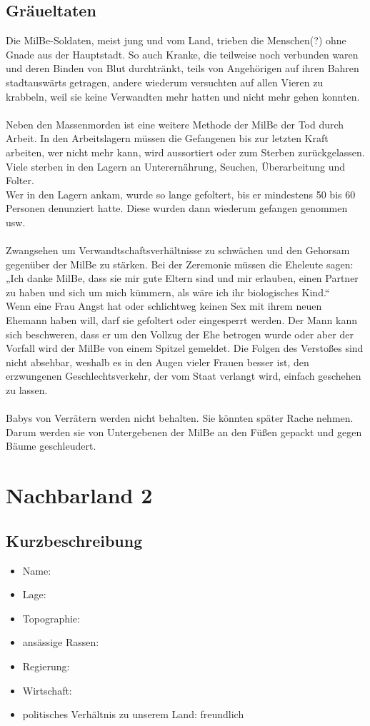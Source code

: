 \subsection{Gräueltaten}
Die MilBe-Soldaten, meist jung und vom Land, trieben die Menschen(?) ohne Gnade aus der Hauptstadt. So auch Kranke, die teilweise noch verbunden waren und deren Binden von Blut durchtränkt, teils von Angehörigen auf ihren Bahren stadtauswärts getragen, andere wiederum versuchten auf allen Vieren zu krabbeln, weil sie keine Verwandten mehr hatten und nicht mehr gehen konnten.\\
\\
Neben den Massenmorden ist eine weitere Methode der MilBe der Tod durch Arbeit. In den Arbeitslagern müssen die Gefangenen bis zur letzten Kraft arbeiten, wer nicht mehr kann, wird aussortiert oder zum Sterben zurückgelassen. Viele sterben in den Lagern an Unterernährung, Seuchen, Überarbeitung und Folter.\\
Wer in den Lagern ankam, wurde so lange gefoltert, bis er mindestens 50 bis 60 Personen denunziert hatte. Diese wurden dann wiederum gefangen genommen usw.\\\\
Zwangsehen um Verwandtschaftsverhältnisse zu schwächen und den Gehorsam gegenüber der MilBe zu stärken. Bei der Zeremonie müssen die Eheleute sagen: „Ich danke MilBe, dass sie mir gute Eltern sind und mir erlauben, einen Partner zu haben und sich um mich kümmern, als wäre ich ihr biologisches Kind.“\\
Wenn eine Frau Angst hat oder schlichtweg keinen Sex mit ihrem neuen Ehemann haben will, darf sie gefoltert oder eingesperrt werden. Der Mann kann sich beschweren, dass er um den Vollzug der Ehe betrogen wurde oder aber der Vorfall wird der MilBe von einem Spitzel gemeldet. Die Folgen des Verstoßes sind nicht absehbar, weshalb es in den Augen vieler Frauen besser ist, den erzwungenen Geschlechtsverkehr, der vom Staat verlangt wird, einfach geschehen zu lassen.\\\\
Babys von Verrätern werden nicht behalten. Sie könnten später Rache nehmen. Darum werden sie von Untergebenen der MilBe an den Füßen gepackt und gegen Bäume geschleudert.

\section{Nachbarland 2}
\subsection{Kurzbeschreibung}
\begin{itemize}
	\item Name: 
	\item Lage:
	\item Topographie:
	\item ansässige Rassen:
	\item Regierung:
	\item Wirtschaft:
	\item politisches Verhältnis zu unserem Land: freundlich
\end{itemize}

